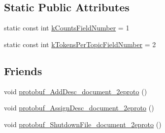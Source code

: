 \subsection*{Static Public Attributes}
\begin{DoxyCompactItemize}
\item 
static const int \hyperlink{class_l_d_a_1_1unigram__counts_aaee872a5cd4d11184182da48eea41468}{kCountsFieldNumber} = 1
\item 
static const int \hyperlink{class_l_d_a_1_1unigram__counts_a97d97f27b22d3f2816f5c16362dca298}{kTokensPerTopicFieldNumber} = 2
\end{DoxyCompactItemize}
\subsection*{Friends}
\begin{DoxyCompactItemize}
\item 
void \hyperlink{class_l_d_a_1_1unigram__counts_a9ca7998089dddfe828221d1f41bf4f9c}{protobuf\_\-AddDesc\_\-document\_\-2eproto} ()
\item 
void \hyperlink{class_l_d_a_1_1unigram__counts_a5c1ac521cee58e6270c99a8c012c8950}{protobuf\_\-AssignDesc\_\-document\_\-2eproto} ()
\item 
void \hyperlink{class_l_d_a_1_1unigram__counts_af79773dc456499799fb950f62b8cd291}{protobuf\_\-ShutdownFile\_\-document\_\-2eproto} ()
\end{DoxyCompactItemize}


